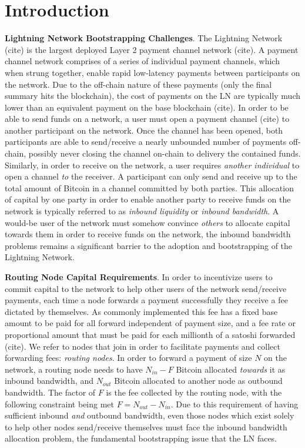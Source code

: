 \documentclass[12pt,a4paper]{article}
\theoremstyle{definition}
\begin{document}
\section{Introduction}

\textbf{Lightning Network Bootstrapping Challenges}. The Lightning Network
(cite) is the largest deployed Layer 2 payment channel network (cite). A
payment channel network comprises of a series of individual payment channels,
which when strung together, enable rapid low-latency payments between
participants on the network. Due to the off-chain nature of these payments
(only the final summary hits the blockchain), the cost of payments on the LN
are typically much lower than an equivalent payment on the base blockchain
(cite). In order to be able to send funds on a network, a user must open a
payment channel (cite) to another participant on the network. Once the channel
has been opened, both participants are able to send/receive a nearly unbounded
number of payments off-chain, possibly never closing the channel on-chain to
delivery the contained funds. Similarly, in order to receive on the network, a
user requires \emph{another individual} to open a channel \emph{to} the
receiver. A participant can only send and receive up to the total amount of
Bitcoin in a channel committed by both parties. This allocation of capital by
one party in order to enable another party to receive funds on the network is
typically referred to as \emph{inbound liquidity} or \emph{inbound bandwidth}.
A would-be user of the network must somehow convince \emph{others} to allocate
capital towards them in order to receive funds on the network, the inbound
bandwidth problems remains a significant barrier to the adoption and
bootstrapping of the Lightning Network.

\textbf{Routing Node Capital Requirements}.  In order to incentivize users to
commit capital to the network to help other users of the network send/receive
payments, each time a node forwards a payment successfully they receive a fee
dictated by themselves. As commonly implemented this fee has a fixed base
amount to be paid for all forward independent of payment size, and a fee rate
or proportional amount that must be paid for each millionth of a satoshi
forwarded (cite). We refer to nodes that join in order to facilitate payments
and collect forwarding fees: \emph{routing nodes}. In order to forward a
payment of size $N$ on the network, a routing node needs to have $N_{in} - F$
Bitcoin allocated \emph{towards} it as inbound bandwidth, and $N_{out}$ Bitcoin
allocated to another node as outbound bandwidth. The factor of $F$ is the fee
collected by the routing node, with the following constraint being met $F =
N_{out} - N_{in}$. Due to this requirement of having sufficient inbound
\emph{and} outbound bandwidth, even those nodes which exist solely to help
other nodes send/receive themselves must face the inbound bandwidth allocation
problem, the fundamental bootstrapping issue that the LN faces.
\end{document}
